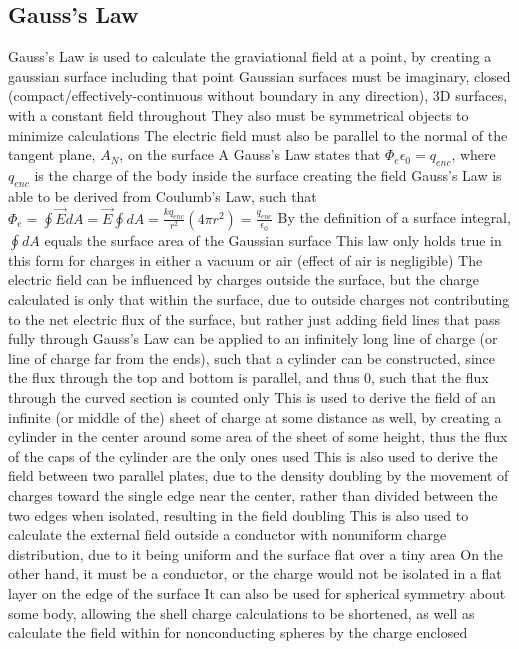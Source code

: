 \documentclass[11 pt, twoside]{article}
\newenvironment{outline*}
{
	\begin{outline}[enumerate]
	}
	{\end{outline}
}
\begin{document}
\subsection{Gauss's Law}
\begin{outline*}
\1 Gauss’s Law is used to calculate the graviational field at a point, by creating a gaussian surface including that point
\2 Gaussian surfaces must be imaginary, closed (compact/effectively-continuous without boundary in any direction), 3D surfaces, with a constant field throughout
\2 They also must be symmetrical objects to minimize calculations
\2 The electric field must also be parallel to the normal of the tangent plane, $A_N$, on the surface A
\1 Gauss's Law states that $\Phi_e \epsilon_0 = q_{enc}$, where $q_{enc}$ is the charge of the body inside the surface creating the field
\2 Gauss's Law is able to be derived from Coulumb's Law, such that $\Phi_e = \oint \vec{E} dA = \vec{E} \oint dA = \frac{kq_{enc}}{r^2} (4\pi r^2) = \frac{q_{enc}}{\epsilon_0}$
\2 By the definition of a surface integral, $\oint dA$ equals the surface area of the Gaussian surface
\2 This law only holds true in this form for charges in either a vacuum or air (effect of air is negligible)
\2 The electric field can be influenced by charges outside the surface, but the charge calculated is only that within the surface, due to outside charges not contributing to the net electric flux of the surface, but rather just adding field lines that pass fully through
\1 Gauss's Law can be applied to an infinitely long line of charge (or line of charge far from the ends), such that a cylinder can be constructed, since the flux through the top and bottom is parallel, and thus 0, such that the flux through the curved section is counted only
\2 This is used to derive the field of an infinite (or middle of the) sheet of charge at some distance as well, by creating a cylinder in the center around some area of the sheet of some height, thus the flux of the caps of the cylinder are the only ones used
\3 This is also used to derive the field between two parallel plates, due to the density doubling by the movement of charges toward the single edge near the center, rather than divided between the two edges when isolated, resulting in the field doubling
\3 This is also used to calculate the external field outside a conductor with nonuniform charge distribution, due to it being uniform and the surface flat over a tiny area
\4 On the other hand, it must be a conductor, or the charge would not be isolated in a flat layer on the edge of the surface
\2 It can also be used for spherical symmetry about some body, allowing the shell charge calculations to be shortened, as well as calculate the field within for nonconducting spheres by the charge enclosed

\end{outline*}
\end{document}
